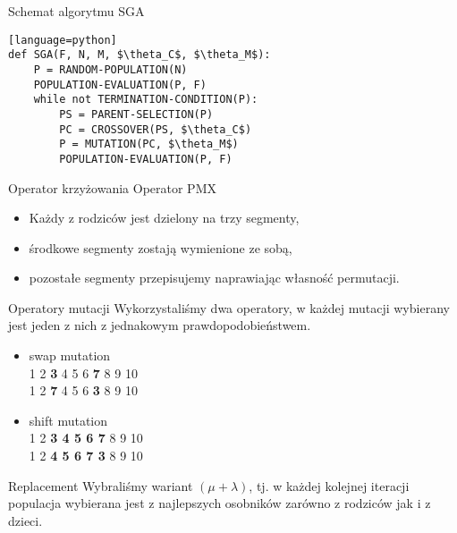 \begin{frame}[fragile]
\begin{block}{Schemat algorytmu SGA}
\begin{lstlisting}[mathescape][language=python]
def SGA(F, N, M, $\theta_C$, $\theta_M$):
    P = RANDOM-POPULATION(N)
    POPULATION-EVALUATION(P, F)
    while not TERMINATION-CONDITION(P):
        PS = PARENT-SELECTION(P)
        PC = CROSSOVER(PS, $\theta_C$)
        P = MUTATION(PC, $\theta_M$)
        POPULATION-EVALUATION(P, F)
\end{lstlisting}
\end{block}
\end{frame}

\begin{frame}[fragile]
\begin{block}{Operator krzyżowania}
Operator PMX
\begin{itemize}
\item Każdy z rodziców jest dzielony na trzy segmenty,
\item środkowe segmenty zostają wymienione ze sobą,
\item pozostałe segmenty przepisujemy naprawiając własność permutacji.
\end{itemize}
\end{block}
\end{frame}

\begin{frame}[fragile]
\begin{block}{Operatory mutacji}
Wykorzystaliśmy dwa operatory, w każdej mutacji wybierany jest jeden z nich z jednakowym prawdopodobieństwem.
\begin{itemize}
\item swap mutation \\
1 2 \textbf{3} 4 5 6 \textbf{7} 8 9 10 \\
1 2 \textbf{7} 4 5 6 \textbf{3} 8 9 10 \\
\item shift mutation \\ 
1 2 \textbf{3 4 5 6 7} 8 9 10 \\
1 2 \textbf{4 5 6 7 3} 8 9 10 \\
\end{itemize}
\end{block}
\end{frame}

\begin{frame}[fragile]
\begin{block}{Replacement}
Wybraliśmy wariant $(\mu + \lambda)$, tj. w każdej kolejnej iteracji populacja wybierana jest z najlepszych osobników zarówno z rodziców jak i z dzieci.
\end{block}
\end{frame}
